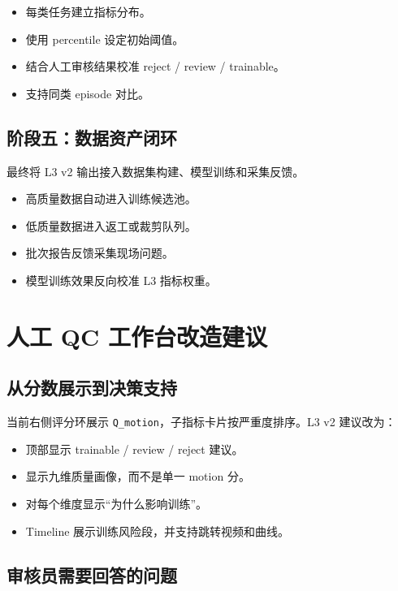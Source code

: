 \documentclass[UTF8,zihao=-4,oneside,openany]{ctexrep}
\begin{document}
\begin{itemize}
  \item 每类任务建立指标分布。
  \item 使用 percentile 设定初始阈值。
  \item 结合人工审核结果校准 reject / review / trainable。
  \item 支持同类 episode 对比。
\end{itemize}

\subsection{阶段五：数据资产闭环}

最终将 L3 v2 输出接入数据集构建、模型训练和采集反馈。

\begin{itemize}
  \item 高质量数据自动进入训练候选池。
  \item 低质量数据进入返工或裁剪队列。
  \item 批次报告反馈采集现场问题。
  \item 模型训练效果反向校准 L3 指标权重。
\end{itemize}

\section{人工 QC 工作台改造建议}

\subsection{从分数展示到决策支持}

当前右侧评分环展示 \texttt{Q\_motion}，子指标卡片按严重度排序。L3 v2 建议改为：

\begin{itemize}
  \item 顶部显示 trainable / review / reject 建议。
  \item 显示九维质量画像，而不是单一 motion 分。
  \item 对每个维度显示“为什么影响训练”。
  \item Timeline 展示训练风险段，并支持跳转视频和曲线。
\end{itemize}

\subsection{审核员需要回答的问题}
\end{document}
